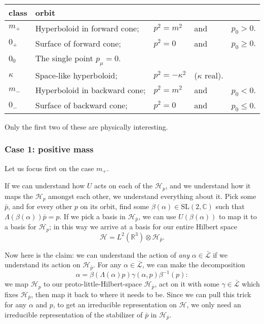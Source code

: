 \documentclass[a4paper,10pt]{scrreprt}
\newcommand{\R}{\mathbb{R}}
\newcommand{\C}{\mathbb{C}}
\newcommand{\SL}{\mathrm{SL}}
\theoremstyle{definition}
\theoremstyle{plain}
\theoremstyle{remark}
\begin{document}
\begin{center}
  \begin{tabular}{l l l l l}
    class & orbit &  \\
    \hline
    $m_{+}$ & Hyperboloid in forward cone; & $p^{2} = m^{2}$ & and & $p_{0} > 0$. \\
    $0_{+}$ & Surface of forward cone; & $p^{2} = 0$ & and & $p_{0} \geq 0$. \\
    $0_{0}$ & The single point $p_{\mu} = 0$. \\
    $\kappa$ & Space-like hyperboloid; & $p^{2} = -\kappa^{2}$ & ($\kappa$ real). \\
    $m_{-}$ & Hyperboloid in backward cone; & $p^{2} = m^{2}$ & and & $p_{0} < 0$. \\
    $0_{-}$ & Surface of backward cone; & $p^{2} = 0$ & and & $p_{0} \leq 0$. \\
    \hline
  \end{tabular}
\end{center}
Only the first two of these are physically interesting.

\subsubsection{Case 1: positive mass}
Let us focus first on the case $m_{+}$.

If we can understand how $U$ acts on each of the $\mathscr{H}_{p}$, and we understand how it maps the $\mathscr{H}_{p}$ amongst each other, we understand everything about it. Pick some $\bar{p}$, and for every other $p$ on its orbit, find some $\beta(\alpha) \in \SL(2, \C)$ such that $\Lambda(\beta(\alpha))\bar{p} = p$. If we pick a basis in $\mathscr{H}_{\bar{p}}$, we can use $U(\beta(\alpha))$ to map it to a basis for $\mathscr{H}_{p}$; in this way we arrive at a basis for our entire Hilbert space 
\begin{equation*}
  \mathscr{H} = L^{2}(\R^{3}) \otimes \mathscr{H}_{\bar{p}}.
\end{equation*}

Now here is the claim: we can understand the action of \emph{any} $\alpha \in \bar{\mathcal{L}}$ if we understand its action on $\mathscr{H}_{\bar{p}}$. For any $\alpha \in \bar{\mathcal{L}}$, we can make the decomposition 
\begin{equation*}
  \alpha = \beta(\Lambda(\alpha)p) \gamma(\alpha, p) \beta^{-1}(p):
\end{equation*}
we map $\mathscr{H}_{p}$ to our proto-little-Hilbert-space $\mathscr{H}_{\bar{p}}$, act on it with some $\gamma \in \bar{\mathcal{L}}$ which fixes $\mathscr{H}_{\bar{p}}$, then map it back to where it needs to be. Since we can pull this trick for any $\alpha$ and $p$, to get an irreducible representation on $\mathscr{H}$, we only need an irreducible representation of the stabilizer of $\bar{p}$ in $\mathscr{H}_{\bar{p}}$. 
\end{document}
